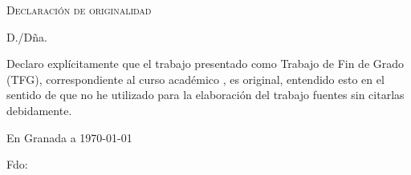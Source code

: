 %

\thispagestyle{empty}

\hfill\vfill

\textsc{Declaración de originalidad}\\\bigskip

D./Dña. \miNombre \\\medskip

Declaro explícitamente que el trabajo presentado como Trabajo de Fin de Grado (TFG), correspondiente al curso académico \miCurso, es original, entendido esto en el sentido de que no he utilizado para la elaboración del trabajo fuentes sin citarlas debidamente.
\medskip

En Granada a \today
\vspace{3cm}
\begin{center}
    Fdo: \miNombre

\end{center}

\vfill

\cleardoublepage
\endinput
